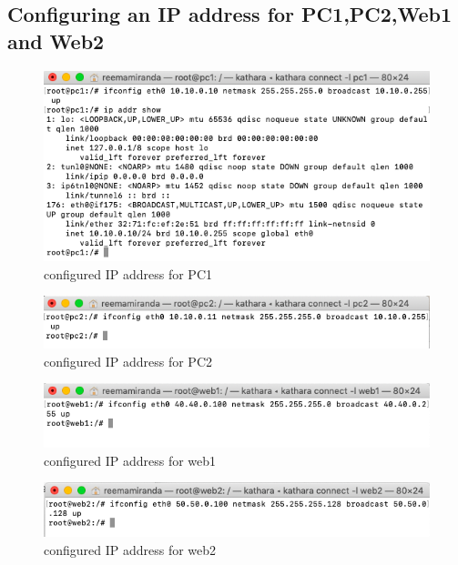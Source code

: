 \subsection{Configuring an IP address for PC1,PC2,Web1 and Web2 }
 \begin{figure}[H]
\centering
  \includegraphics[width=400pt]{Images/pc1.ip.png}
  \caption{configured IP address for PC1}
  \label{fig:2.11}
\end{figure}
\begin{figure}[H]
\centering
  \includegraphics[width=400pt]{Images/pc2.ip.png}
  \caption{configured IP address for PC2}
  \label{fig:2.12}
\end{figure}
\begin{figure}[H]
\centering
  \includegraphics[width=400pt]{Images/web1.ip.png}
  \caption{configured IP address for web1}
  \label{fig:1.13}
\end{figure}
\begin{figure}[H]
\centering
  \includegraphics[width=400pt]{Images/web2.ip.png}
  \caption{configured IP address for web2}
  \label{fig:2.14}
\end{figure}
